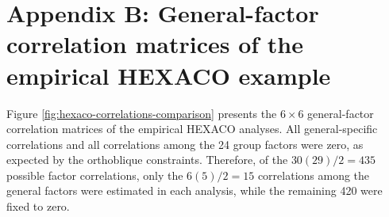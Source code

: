 \documentclass[
  12pt,
  letterpaper,
  article]{scrartcl}
\begin{document}
\section*{Appendix B: General-factor correlation matrices of the
empirical HEXACO
example}\label{appendix-b-general-factor-correlation-matrices-of-the-empirical-hexaco-example}

Figure \ref{fig:hexaco-correlations-comparison} presents the
\(6\times6\) general-factor correlation matrices of the empirical HEXACO
analyses. All general-specific correlations and all correlations among
the 24 group factors were zero, as expected by the orthoblique
constraints. Therefore, of the \(30(29)/2=435\) possible factor
correlations, only the \(6(5)/2=15\) correlations among the general
factors were estimated in each analysis, while the remaining 420 were
fixed to zero.
\end{document}
